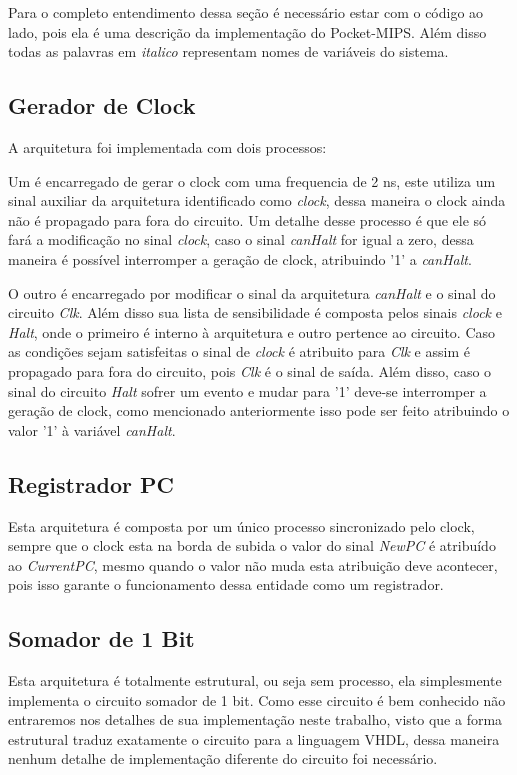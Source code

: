 \documentclass[12pt]{article}
\begin{document}
Para o completo entendimento dessa seção é necessário estar com o código ao lado, pois ela é uma descrição da implementação do Pocket-MIPS. Além disso todas as palavras em \textit{italico} representam nomes de variáveis do sistema.


\subsection{Gerador de Clock}

A arquitetura foi implementada com dois processos: 

Um é encarregado de gerar o clock com uma frequencia de 2 ns, este utiliza um sinal auxiliar da arquitetura identificado como \textit{clock}, dessa maneira o clock ainda não é propagado para fora do circuito. Um detalhe desse processo é que ele só fará a modificação no sinal \textit{clock}, caso o sinal \textit{canHalt} for igual a zero, dessa maneira é possível interromper a geração de clock, atribuindo '1' a \textit{canHalt}.

O outro é encarregado por modificar o sinal da arquitetura \textit{canHalt} e o sinal do circuito \textit{Clk}. Além disso sua lista de sensibilidade é composta pelos sinais \textit{clock} e \textit{Halt}, onde o primeiro é interno à arquitetura e outro pertence ao circuito. Caso as condições sejam satisfeitas o sinal de \textit{clock} é atribuito para \textit{Clk} e assim é propagado para fora do circuito, pois \textit{Clk} é o sinal de saída. Além disso, caso o sinal do circuito \textit{Halt} sofrer um evento e mudar para '1' deve-se interromper a geração de clock, como mencionado anteriormente isso pode ser feito atribuindo o valor '1' à variável \textit{canHalt}.
\subsection{Registrador PC}

Esta arquitetura é composta por um único processo sincronizado pelo clock, sempre que o clock esta na borda de subida o valor do sinal \textit{NewPC} é atribuído ao \textit{CurrentPC}, mesmo quando o valor não muda esta atribuição deve acontecer, pois isso garante o funcionamento dessa entidade como um registrador.
\subsection{Somador de 1 Bit}

Esta arquitetura é totalmente estrutural, ou seja sem processo, ela simplesmente implementa o circuito somador de 1 bit. Como esse circuito é bem conhecido não entraremos nos detalhes de sua implementação neste trabalho, visto que a forma estrutural traduz exatamente o circuito para a linguagem VHDL, dessa maneira nenhum detalhe de implementação diferente do circuito foi necessário.
\end{document}
